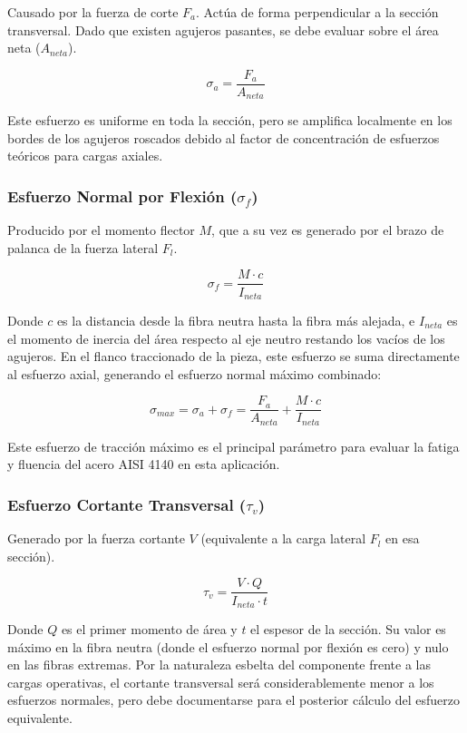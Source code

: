 \documentclass[12pt,letterpaper]{article}
\begin{document}
Causado por la fuerza de corte $F_a$. Actúa de forma perpendicular a la sección transversal. Dado que existen agujeros pasantes, se debe evaluar sobre el área neta ($A_{neta}$).

\[
\sigma_a = \frac{F_a}{A_{neta}}
\]

Este esfuerzo es uniforme en toda la sección, pero se amplifica localmente en los bordes de los agujeros roscados debido al factor de concentración de esfuerzos teóricos para cargas axiales.

\subsubsection{Esfuerzo Normal por Flexión ($\sigma_f$)}

Producido por el momento flector $M$, que a su vez es generado por el brazo de palanca de la fuerza lateral $F_l$.

\[
\sigma_f = \frac{M \cdot c}{I_{neta}}
\]

Donde $c$ es la distancia desde la fibra neutra hasta la fibra más alejada, e $I_{neta}$ es el momento de inercia del área respecto al eje neutro restando los vacíos de los agujeros. En el flanco traccionado de la pieza, este esfuerzo se suma directamente al esfuerzo axial, generando el esfuerzo normal máximo combinado:

\[
\sigma_{max} = \sigma_a + \sigma_f =
\frac{F_a}{A_{neta}} + \frac{M \cdot c}{I_{neta}}
\]

Este esfuerzo de tracción máximo es el principal parámetro para evaluar la fatiga y fluencia del acero AISI 4140 en esta aplicación.

\subsubsection{Esfuerzo Cortante Transversal ($\tau_v$)}

Generado por la fuerza cortante $V$ (equivalente a la carga lateral $F_l$ en esa sección).

\[
\tau_v = \frac{V \cdot Q}{I_{neta} \cdot t}
\]

Donde $Q$ es el primer momento de área y $t$ el espesor de la sección. Su valor es máximo en la fibra neutra (donde el esfuerzo normal por flexión es cero) y nulo en las fibras extremas. Por la naturaleza esbelta del componente frente a las cargas operativas, el cortante transversal será considerablemente menor a los esfuerzos normales, pero debe documentarse para el posterior cálculo del esfuerzo equivalente.
\end{document}

